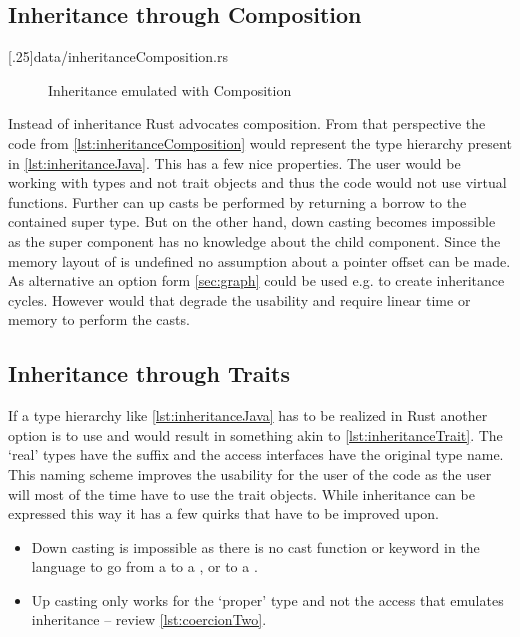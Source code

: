 \documentclass[thesis]{subfiles}
\begin{document}
  \subsection{Inheritance through Composition}%
    \LstTikzBox{\inheritanceComposition}[.25\linewidth]{data/inheritanceComposition.rs}
    \begin{wrapfigure}{r}{0.38\textwidth}%
      \vspace*{-\baselineskip}%
      \captionsetup{type=lstlisting}%
      \begin{center}%
        \usebox{\inheritanceComposition}%
      \end{center}%
      \vspace*{-\baselineskip}%
      \caption{Inheritance emulated with Composition}\label{lst:inheritanceComposition}%
    \end{wrapfigure}%
    Instead of inheritance Rust advocates composition.
    From that perspective the code from \autoref{lst:inheritanceComposition} would represent the type hierarchy present in \autoref{lst:inheritanceJava}.
    This has a few nice properties.
    The user would be working with types and not trait objects and thus the code would not use virtual functions.
    Further can up casts be performed by returning a borrow to the contained super type.
    But on the other hand, down casting becomes impossible as the super component has no knowledge about the child component.
    Since the memory layout of \structs is undefined\autocite[0079-undefined-struct-layout]{rust-rfc} no assumption about a pointer offset can be made.
    As alternative an option form \autoref{sec:graph} could be used e.g.  to create inheritance cycles.
    However would that degrade the usability and require linear time or memory to perform the casts.

  \subsection{Inheritance through Traits}\label{sec:magic}
    If a type hierarchy like \autoref{lst:inheritanceJava} has to be realized in Rust another option is to use \traits and would result in something akin to \autoref{lst:inheritanceTrait}.
    The `real' types have the suffix  and the access interfaces have the original type name.
    This naming scheme improves the usability for the user of the code as the user will most of the time have to use the trait objects.
    While inheritance can be expressed this way it has a few quirks that have to be improved upon.
    \begin{itemize}
      \item Down casting is impossible as there is no cast function or keyword in the language to go from a \trait to a \struct, or to a \trait.
      \item Up casting only works for the `proper' type and not the access \trait that emulates inheritance -- review \autoref{lst:coercionTwo}.
    \end{itemize}
\end{document}
